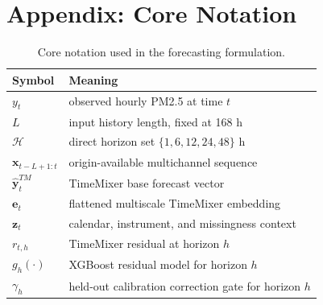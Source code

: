 \documentclass[sn-mathphys-num]{sn-jnl}
\newcommand{\Horizons}{\{1,6,12,24,48\}}
\begin{document}
\section*{Appendix: Core Notation}
\begin{table}[h]
\centering
\caption{Core notation used in the forecasting formulation.}
\label{tab:notation}
\small
\begin{tabular}{ll}
\toprule
Symbol & Meaning \\
\midrule
$y_t$ & observed hourly PM2.5 at time $t$ \\
$L$ & input history length, fixed at 168 h \\
$\mathcal H$ & direct horizon set $\Horizons$ h \\
$\mathbf{x}_{t-L+1:t}$ & origin-available multichannel sequence \\
$\hat{\mathbf y}^{TM}_t$ & TimeMixer base forecast vector \\
$\mathbf e_t$ & flattened multiscale TimeMixer embedding \\
$\mathbf z_t$ & calendar, instrument, and missingness context \\
$r_{t,h}$ & TimeMixer residual at horizon $h$ \\
$g_h(\cdot)$ & XGBoost residual model for horizon $h$ \\
$\gamma_h$ & held-out calibration correction gate for horizon $h$ \\
\bottomrule
\end{tabular}
\end{table}
\end{document}
